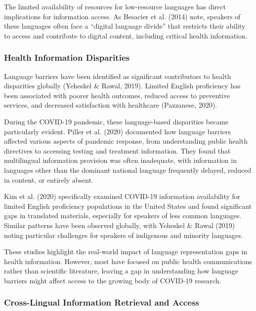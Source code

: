 \documentclass[
]{article}
\begin{document}
The limited availability of resources for low-resource languages has
direct implications for information access. As Besacier et al. (2014)
note, speakers of these languages often face a ``digital language
divide'' that restricts their ability to access and contribute to
digital content, including critical health information.

\subsubsection{Health Information
Disparities}\label{health-information-disparities}

Language barriers have been identified as significant contributors to
health disparities globally (Yeheskel \& Rawal, 2019). Limited English
proficiency has been associated with poorer health outcomes, reduced
access to preventive services, and decreased satisfaction with
healthcare (Pazzanese, 2020).

During the COVID-19 pandemic, these language-based disparities became
particularly evident. Piller et al. (2020) documented how language
barriers affected various aspects of pandemic response, from
understanding public health directives to accessing testing and
treatment information. They found that multilingual information
provision was often inadequate, with information in languages other than
the dominant national language frequently delayed, reduced in content,
or entirely absent.

Kim et al. (2020) specifically examined COVID-19 information
availability for limited English proficiency populations in the United
States and found significant gaps in translated materials, especially
for speakers of less common languages. Similar patterns have been
observed globally, with Yeheskel \& Rawal (2019) noting particular
challenges for speakers of indigenous and minority languages.

These studies highlight the real-world impact of language representation
gaps in health information. However, most have focused on public health
communications rather than scientific literature, leaving a gap in
understanding how language barriers might affect access to the growing
body of COVID-19 research.

\subsubsection{Cross-Lingual Information Retrieval and
Access}\label{cross-lingual-information-retrieval-and-access}
\end{document}
